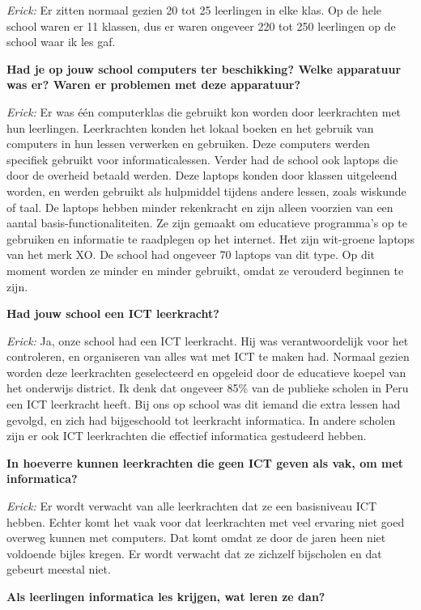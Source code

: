 \textit{Erick:} Er zitten normaal gezien 20 tot 25 leerlingen in elke klas. Op de hele school waren er 11 klassen, dus er waren ongeveer 220 tot 250 leerlingen op de school waar ik les gaf. %

\textbf{Had je op jouw school computers ter beschikking? Welke apparatuur was er? Waren er problemen met deze apparatuur?}

\textit{Erick:} Er was één computerklas die gebruikt kon worden door leerkrachten met hun leerlingen. Leerkrachten konden het lokaal boeken en het gebruik van computers in hun lessen verwerken en gebruiken. Deze computers werden specifiek gebruikt voor informaticalessen. Verder had de school ook laptops die door de overheid betaald werden. Deze laptops konden door klassen uitgeleend worden, en werden gebruikt als hulpmiddel tijdens andere lessen, zoals wiskunde of taal. De laptops hebben minder rekenkracht en zijn alleen voorzien van een aantal basis-functionaliteiten. Ze zijn gemaakt om educatieve programma's op te gebruiken en informatie te raadplegen op het internet. Het zijn wit-groene laptops van het merk XO. De school had ongeveer 70 laptops van dit type. Op dit moment worden ze minder en minder gebruikt, omdat ze verouderd beginnen te zijn.

\textbf{Had jouw school een ICT leerkracht?}

\textit{Erick:} Ja, onze school had een ICT leerkracht. Hij was verantwoordelijk voor het controleren, en organiseren van alles wat met ICT te maken had. Normaal gezien worden deze leerkrachten geselecteerd en opgeleid door de educatieve koepel van het onderwijs district. Ik denk dat ongeveer 85\% van de publieke scholen in Peru een ICT leerkracht heeft. Bij ons op school was dit iemand die extra lessen had gevolgd, en zich had bijgeschoold tot leerkracht informatica. In andere scholen zijn er ook ICT leerkrachten die effectief informatica gestudeerd hebben.

\textbf{In hoeverre kunnen leerkrachten die geen ICT geven als vak, om met informatica?}

\textit{Erick:} Er wordt verwacht van alle leerkrachten dat ze een basisniveau ICT hebben. Echter komt het vaak voor dat leerkrachten met veel ervaring niet goed overweg kunnen met computers. Dat komt omdat ze door de jaren heen niet voldoende bijles kregen. Er wordt verwacht dat ze zichzelf bijscholen en dat gebeurt meestal niet.

\textbf{Als leerlingen informatica les krijgen, wat leren ze dan?}

